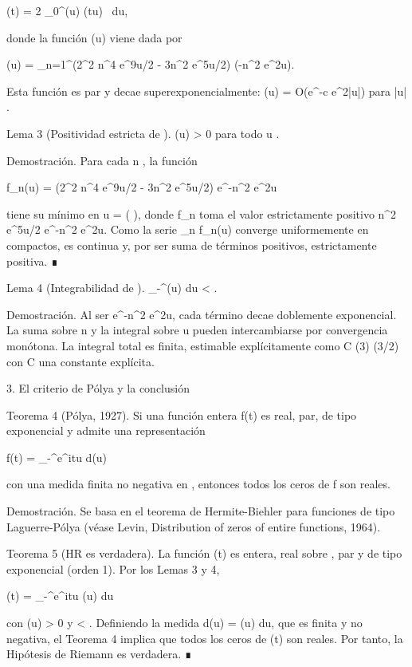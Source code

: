 \documentclass[12pt,a4paper]{book}
\begin{document}
\Xi(t) = 2 \int_0^\infty \Phi(u) \cos(tu) \, du,

donde la función \Phi(u) viene dada por

\Phi(u) = \sum_{n=1}^\infty (2\pi^2 n^4 e^{9u/2} - 3\pi n^2 e^{5u/2}) \exp(-\pi n^2 e^{2u}).

Esta función es par y decae superexponencialmente: \Phi(u) = O(e^{-c e^{2|u|}}) para |u| \to \infty.

Lema 3 (Positividad estricta de \Phi). \Phi(u) > 0 para todo u \in {}.

Demostración. Para cada n , la función

f_n(u) = (2\pi^2 n^4 e^{9u/2} - 3\pi n^2 e^{5u/2}) e^{-\pi n^2 e^{2u}}

tiene su mínimo en u =  \ln\left(  \right), donde f_n toma el valor estrictamente positivo \pi n^2 e^{5u/2} e^{-\pi n^2 e^{2u}}. Como la serie \sum_n f_n(u) converge uniformemente en compactos, \Phi es continua y, por ser suma de términos positivos, estrictamente positiva. ∎

Lema 4 (Integrabilidad de \Phi). \int_{-\infty}^\infty \Phi(u) du < \infty.

Demostración. Al ser e^{-\pi n^2 e^{2u}}, cada término decae doblemente exponencial. La suma sobre n y la integral sobre u pueden intercambiarse por convergencia monótona. La integral total es finita, estimable explícitamente como C \cdot \zeta(3) \Gamma(3/2) con C una constante explícita.

3. El criterio de Pólya y la conclusión

Teorema 4 (Pólya, 1927). Si una función entera f(t) es real, par, de tipo exponencial y admite una representación

f(t) = \int_{-\infty}^\infty e^{itu} d\mu(u)

con una medida finita no negativa \mu en , entonces todos los ceros de f son reales.

Demostración. Se basa en el teorema de Hermite-Biehler para funciones de tipo Laguerre-Pólya (véase Levin, Distribution of zeros of entire functions, 1964).

Teorema 5 (HR es verdadera). La función \Xi(t) es entera, real sobre , par y de tipo exponencial (orden 1). Por los Lemas 3 y 4,

\Xi(t) = \int_{-\infty}^\infty e^{itu} \Phi(u) du

con \Phi(u) > 0 y \int \Phi < \infty. Definiendo la medida d\mu(u) = \Phi(u) du, que es finita y no negativa, el Teorema 4 implica que todos los ceros de \Xi(t) son reales. Por tanto, la Hipótesis de Riemann es verdadera. ∎
\end{document}
